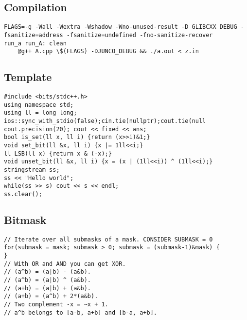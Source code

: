 \documentclass[a4paper]{article}
\begin{document}
\subsection*{Compilation}
\begin{verbatim}
FLAGS=-g -Wall -Wextra -Wshadow -Wno-unused-result -D_GLIBCXX_DEBUG -fsanitize=address -fsanitize=undefined -fno-sanitize-recover
run_a run_A: clean
	@g++ A.cpp \$(FLAGS) -DJUNCO_DEBUG && ./a.out < z.in
\end{verbatim}
\subsection*{Template}
\begin{multicols}{2}
\begin{verbatim}
#include <bits/stdc++.h>
using namespace std;
using ll = long long;
ios::sync_with_stdio(false);cin.tie(nullptr);cout.tie(null
cout.precision(20); cout << fixed << ans;
bool is_set(ll x, ll i) {return (x>>i)&1;}
void set_bit(ll &x, ll i) {x |= 1ll<<i;}
ll LSB(ll x) {return x & (-x);}
void unset_bit(ll &x, ll i) {x = (x | (1ll<<i)) ^ (1ll<<i);}
stringstream ss;
ss << "Hello world";
while(ss >> s) cout << s << endl;
ss.clear();
\end{verbatim}
\end{multicols}
\subsection*{Bitmask}
\begin{multicols}{2}
\begin{verbatim}
// Iterate over all submasks of a mask. CONSIDER SUBMASK = 0
for(submask = mask; submask > 0; submask = (submask-1)&mask) {
}
// With OR and AND you can get XOR. 
// (a^b) = (a|b) - (a&b).
// (a^b) = (a|b) ^ (a&b).
// (a+b) = (a|b) + (a&b).
// (a+b) = (a^b) + 2*(a&b).
// Two complement -x = ~x + 1.
// a^b belongs to [a-b, a+b] and [b-a, a+b].
\end{verbatim}
\end{multicols}
\end{document}
